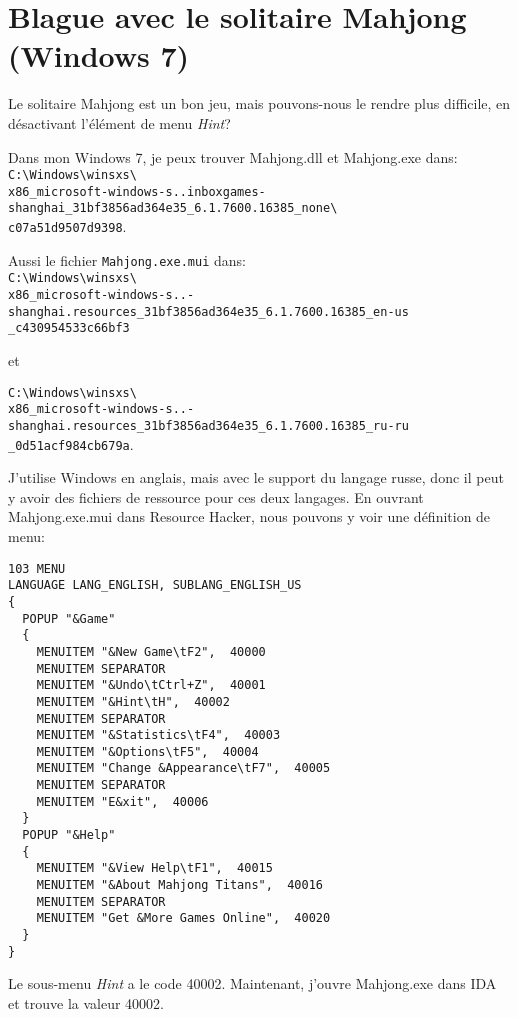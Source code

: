 ﻿\section{Blague avec le solitaire Mahjong (Windows 7)}

Le solitaire Mahjong est un bon jeu, mais pouvons-nous le rendre plus difficile,
en désactivant l'élément de menu \emph{Hint}?

Dans mon Windows 7, je peux trouver Mahjong.dll et Mahjong.exe dans:\\
\verb|C:\Windows\winsxs\| \\
\verb|x86_microsoft-windows-s..inboxgames-shanghai_31bf3856ad364e35_6.1.7600.16385_none\| \\
\verb|c07a51d9507d9398|.

Aussi le fichier \verb|Mahjong.exe.mui| dans:\\
\verb|C:\Windows\winsxs\| \\
\verb|x86_microsoft-windows-s..-shanghai.resources_31bf3856ad364e35_6.1.7600.16385_en-us| \\
\verb|_c430954533c66bf3|

et

\verb|C:\Windows\winsxs\| \\
\verb|x86_microsoft-windows-s..-shanghai.resources_31bf3856ad364e35_6.1.7600.16385_ru-ru| \\
\verb|_0d51acf984cb679a|.

J'utilise Windows en anglais, mais avec le support du langage russe, donc il peut
y avoir des fichiers de ressource pour ces deux langages.
En ouvrant Mahjong.exe.mui dans Resource Hacker, nous pouvons y voir une définition
de menu:

\begin{lstlisting}[caption=Ressource de menu de Mahjong.exe.mui]
103 MENU
LANGUAGE LANG_ENGLISH, SUBLANG_ENGLISH_US
{
  POPUP "&Game"
  {
    MENUITEM "&New Game\tF2",  40000
    MENUITEM SEPARATOR
    MENUITEM "&Undo\tCtrl+Z",  40001
    MENUITEM "&Hint\tH",  40002
    MENUITEM SEPARATOR
    MENUITEM "&Statistics\tF4",  40003
    MENUITEM "&Options\tF5",  40004
    MENUITEM "Change &Appearance\tF7",  40005
    MENUITEM SEPARATOR
    MENUITEM "E&xit",  40006
  }
  POPUP "&Help"
  {
    MENUITEM "&View Help\tF1",  40015
    MENUITEM "&About Mahjong Titans",  40016
    MENUITEM SEPARATOR
    MENUITEM "Get &More Games Online",  40020
  }
}
\end{lstlisting}

Le sous-menu \emph{Hint} a le code 40002.
Maintenant, j'ouvre Mahjong.exe dans IDA et trouve la valeur 40002.

